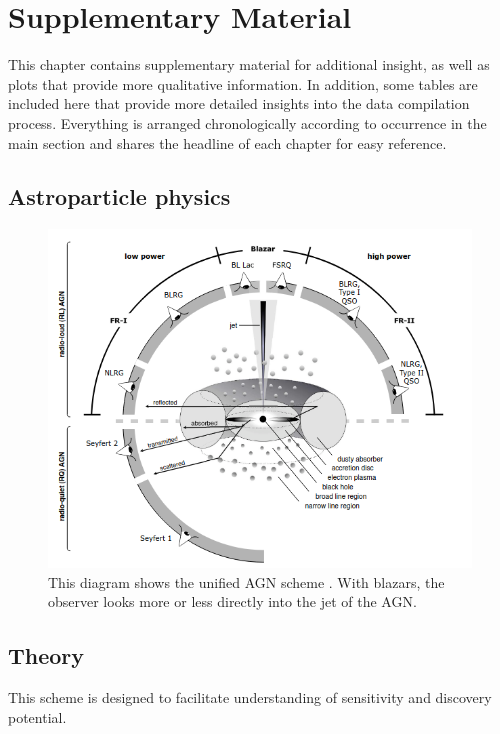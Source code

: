 \chapter{Supplementary Material} \label{sec:appendix}

This chapter contains supplementary material for additional insight, as well as plots that provide more qualitative information.
In addition, some tables are included here that provide more detailed insights into the data compilation process.
Everything is arranged chronologically according to occurrence in the main section and shares the headline of each chapter for easy reference.

\section{Astroparticle physics}

\begin{figure}
    \centering
    \includegraphics[width=\linewidth]{Plots/appendix/agn.png}
    \caption{This diagram shows the unified AGN scheme \cite{agn}. With blazars, the observer looks more or less directly into the jet of the AGN.}
    \label{fig:agn}
\end{figure}

\section{Theory}

This scheme is designed to facilitate understanding of sensitivity and discovery potential.

